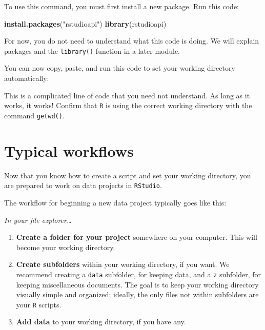 \documentclass[
]{book}
\newenvironment{Shaded}{\begin{snugshade}}{\end{snugshade}}
\newcommand{\FunctionTok}[1]{\textcolor[rgb]{0.13,0.29,0.53}{\textbf{#1}}}
\newcommand{\NormalTok}[1]{#1}
\newcommand{\SpecialCharTok}[1]{\textcolor[rgb]{0.81,0.36,0.00}{\textbf{#1}}}
\newcommand{\StringTok}[1]{\textcolor[rgb]{0.31,0.60,0.02}{#1}}
\begin{document}
To use this command, you must first install a new package. Run this code:

\begin{Shaded}
\begin{Highlighting}[]
\FunctionTok{install.packages}\NormalTok{(}\StringTok{"rstudioapi"}\NormalTok{)}
\FunctionTok{library}\NormalTok{(rstudioapi)}
\end{Highlighting}
\end{Shaded}

For now, you do not need to understand what this code is doing. We will explain packages and the \texttt{library()} function in a later module.

You can now copy, paste, and run this code to set your working directory automatically:

\begin{Shaded}
\end{Shaded}

This is a complicated line of code that you need not understand. As long as it works, it works! Confirm that \texttt{R} is using the correct working directory with the command \texttt{getwd()}.

\section*{Typical workflows}\label{typical-workflows}

Now that you know how to create a script and set your working directory, you are prepared to work on data projects in \texttt{RStudio}.

The workflow for beginning a new data project typically goes like this:

\emph{In your file explorer\ldots{}}

\begin{enumerate}
\def\labelenumi{\arabic{enumi}.}
\item
  \textbf{Create a folder for your project} somewhere on your computer. This will become your working directory.
\item
  \textbf{Create subfolders} within your working directory, if you want. We recommend creating a \texttt{data} subfolder, for keeping data, and a \texttt{z} subfolder, for keeping miscellaneous documents. The goal is to keep your working directory visually simple and organized; ideally, the only files not within subfolders are your \texttt{R} scripts.
\item
  \textbf{Add data} to your working directory, if you have any.
\end{enumerate}
\end{document}
